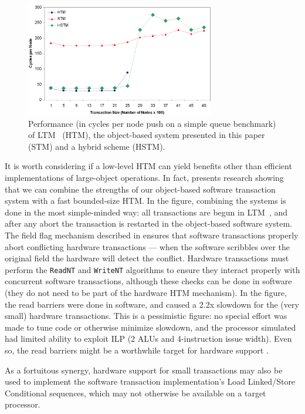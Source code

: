 \begin{figure}[t]\begin{center}%
\includegraphics[width=3.25in,clip=true]{Figures/sean_lie_6b}%
\end{center}%
\caption{Performance (in cycles per node push on a simple queue
  benchmark) of LTM~\cite{AnanianAsKuLeLi04} (HTM), the
  object-based system presented in this paper (STM) and a hybrid
  scheme (HSTM).}%
\label{fig:hybrid}%
\end{figure}
It is worth considering if a low-level HTM can yield benefits other
than efficient implementations of large-object operations.  In fact,
 presents research showing that we can combine the
strengths of our object-based software transaction system with a
fast bounded-size HTM.  In the figure, combining the systems is done
in the most simple-minded way: all transactions are begun in
LTM~\cite{AnanianAsKuLeLi04},
and after any abort the transaction is restarted in the
object-based software system.
  The field flag mechanism described in
 ensures that software transactions properly abort
conflicting hardware transactions --- when the software scribbles
\FLAG over the original field the hardware will detect the conflict.
Hardware transactions must perform
the \texttt{ReadNT} and \texttt{WriteNT} algorithms to ensure they
interact properly with concurrent software transactions, although these
checks can be done in software (they do not need to be part of the
hardware HTM mechanism).  In the figure, the read barriers were done
in software, and caused a 2.2x slowdown for the (very small) hardware
transactions.  This is a pessimistic figure: no special effort was
made to tune code or otherwise minimize slowdown, and the processor
simulated had limited ability to exploit ILP (2 ALUs and 4-instruction
issue width).  Even so, the read barriers might be a worthwhile target
for hardware support \cite{ClickTeWo05}.

As a fortuitous synergy, hardware support for small transactions may
also be used to implement the software transaction implementation's
Load Linked/Store Conditional sequences, which may not
otherwise be available on a target processor.
